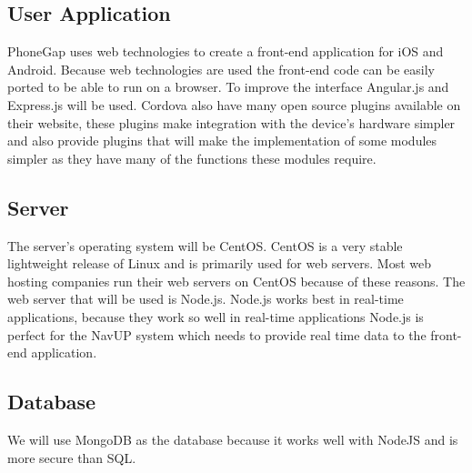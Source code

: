 \documentclass[11pt]{article}
\begin{document}
	\subsection{User Application}
	PhoneGap uses web technologies to create a front-end application for iOS and Android. Because web technologies are used the front-end code can be easily ported to be able to run on a browser. To improve the interface Angular.js and Express.js will be used. Cordova also have many open source plugins available on their website, these plugins make integration with the device's hardware simpler and also provide plugins that will make the implementation of some modules simpler as they have many of the functions these modules require.
	\subsection{Server}
	The server's operating system will be CentOS. CentOS is a very stable lightweight release of Linux and is primarily used for web servers. Most web hosting companies run their web servers on CentOS because of these reasons. The web server that will be used is Node.js. Node.js works best in real-time applications, because they work so well in real-time applications Node.js is perfect for the NavUP system which needs to provide real time data to the front-end application.
	\subsection{Database}
	We will use MongoDB as the database because it works well with NodeJS and is more secure than SQL.
	
\end{document}
